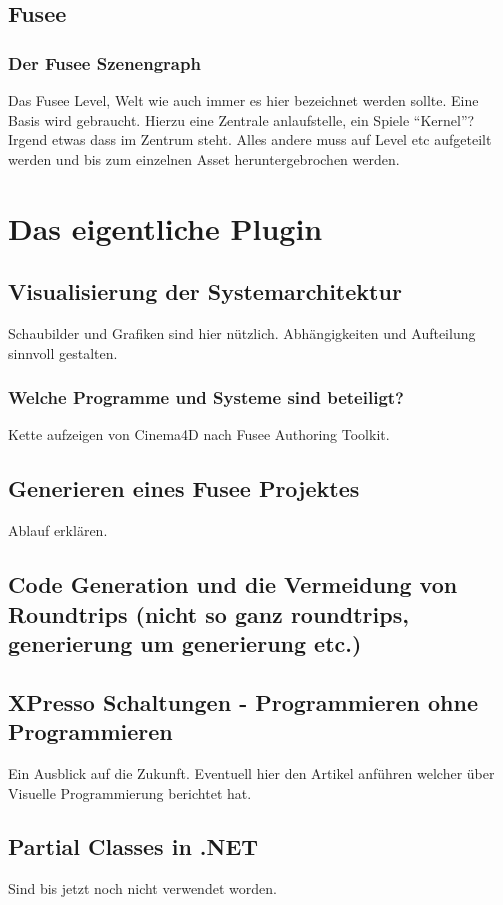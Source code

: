 \documentclass[pagesize, paper=a4, fontsize=12pt,titlepage=true, headings=small, headnosepline, abstractoff, liststotoc, nochapterprefix, plainheadsepline, twoside]{scrreprt}
\begin{document}
\subsection{Fusee}
\subsubsection{Der Fusee Szenengraph}
Das Fusee Level, Welt wie auch immer es hier bezeichnet werden sollte. Eine Basis wird gebraucht. Hierzu eine Zentrale anlaufstelle, ein Spiele “Kernel”? Irgend etwas dass im Zentrum steht.
Alles andere muss auf Level etc aufgeteilt werden und bis zum einzelnen Asset heruntergebrochen werden.

\section{Das eigentliche Plugin}
\subsection{Visualisierung der Systemarchitektur}
Schaubilder und Grafiken sind hier nützlich. Abhängigkeiten und Aufteilung sinnvoll gestalten.
\subsubsection{Welche Programme und Systeme sind beteiligt?}
Kette aufzeigen von Cinema4D nach Fusee Authoring Toolkit.
\subsection{Generieren eines Fusee Projektes}
Ablauf erklären.
\subsection{Code Generation und die Vermeidung von Roundtrips (nicht so ganz roundtrips, generierung um generierung etc.)}
\subsection{XPresso Schaltungen - Programmieren ohne Programmieren}
Ein Ausblick auf die Zukunft. Eventuell hier den Artikel anführen welcher über Visuelle Programmierung berichtet hat.
\subsection{Partial Classes in .NET}
Sind bis jetzt noch nicht verwendet worden.
\end{document}
